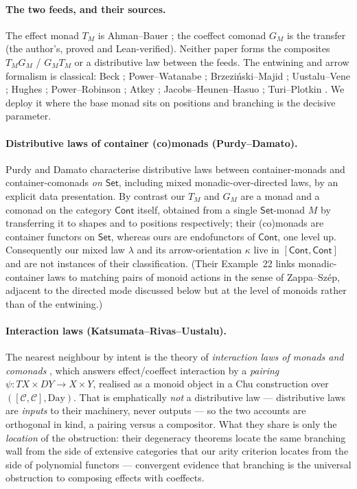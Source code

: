 \documentclass[11pt]{amsart}
\theoremstyle{plain}
\theoremstyle{definition}
\theoremstyle{remark}
\newcommand{\Set}{\mathsf{Set}}
\newcommand{\Cont}{\mathsf{Cont}}
\begin{document}
\paragraph{The two feeds, and their sources.}
The effect monad $T_M$ is Ahman--Bauer \cite[Thm.~6.3]{AhmanBauer24}; the coeffect comonad
$G_M$ is the transfer (the author's, proved and Lean-verified). Neither paper forms the
composites $T_M G_M$ / $G_M T_M$ or a distributive law between the feeds. The entwining and
arrow formalism is classical: Beck \cite{Beck69}; Power--Watanabe \cite{PowerWatanabe02};
Brzezi\'nski--Majid \cite{BrzezinskiMajid98}; Uustalu--Vene \cite{UustaluVene08}; Hughes
\cite{Hughes00}; Power--Robinson \cite{PowerRobinson97}; Atkey \cite{Atkey11};
Jacobs--Heunen--Hasuo \cite{JacobsHeunenHasuo09}; Turi--Plotkin \cite{TuriPlotkin97}. We
deploy it where the base monad sits on positions and branching is the decisive parameter.

\paragraph{Distributive laws of container (co)monads (Purdy--Damato).}
Purdy and Damato \cite{PurdyDamato25} characterise distributive laws between
container-monads and container-comonads \emph{on $\Set$}, including mixed
monadic-over-directed laws, by an explicit data presentation. By contrast our $T_M$ and $G_M$
are a monad and a comonad on the category $\Cont$ itself, obtained from a single $\Set$-monad
$M$ by transferring it to shapes and to positions respectively; their (co)monads are container
functors on $\Set$, whereas ours are endofunctors of $\Cont$, one level up. Consequently our
mixed law $\lambda$ and its arrow-orientation $\kappa$ live in $[\Cont,\Cont]$ and are not
instances of their classification. (Their Example~22 links monadic-container laws to matching
pairs of monoid actions in the sense of Zappa--Sz\'ep, adjacent to the directed mode discussed
below but at the level of monoids rather than of the entwining.)

\paragraph{Interaction laws (Katsumata--Rivas--Uustalu).}
The nearest neighbour by intent is the theory of \emph{interaction laws of monads and comonads}
\cite{KRU20}, which answers effect/coeffect interaction by a \emph{pairing}
$\psi\colon TX\times DY\to X\times Y$, realised as a monoid object in a Chu construction over
$([\mathcal C,\mathcal C],\mathrm{Day})$. That is emphatically \emph{not} a distributive law
--- distributive laws are \emph{inputs} to their machinery, never outputs --- so the two
accounts are orthogonal in kind, a pairing versus a compositor. What they share is only the
\emph{location} of the obstruction: their degeneracy theorems locate the same branching wall
from the side of extensive categories that our arity criterion locates from the side of
polynomial functors --- convergent evidence that branching is the universal obstruction to
composing effects with coeffects.
\end{document}
